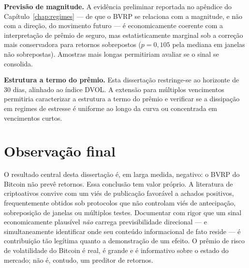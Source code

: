 \textbf{Previsão de magnitude.} A evidência preliminar reportada no apêndice do Capítulo~\ref{chap:regimes} --- de que o BVRP se relaciona com a magnitude, e não com a direção, do movimento futuro --- é economicamente coerente com a interpretação de prêmio de seguro, mas estatisticamente marginal sob a correção mais conservadora para retornos sobrepostos ($p = 0{,}105$ pela mediana em janelas não sobrepostas). Amostras mais longas permitiriam avaliar se o sinal se consolida.

\textbf{Estrutura a termo do prêmio.} Esta dissertação restringe-se ao horizonte de 30 dias, alinhado ao índice DVOL. A extensão para múltiplos vencimentos permitiria caracterizar a estrutura a termo do prêmio e verificar se a dissipação em regimes de estresse é uniforme ao longo da curva ou concentrada em vencimentos curtos.

\section{Observação final}
\label{sec:conclusao_final}

O resultado central desta dissertação é, em larga medida, negativo: o BVRP do Bitcoin não prevê retornos. Essa conclusão tem valor próprio. A literatura de criptoativos convive com um viés de publicação favorável a achados positivos, frequentemente obtidos sob protocolos que não controlam viés de antecipação, sobreposição de janelas ou múltiplos testes. Documentar com rigor que um sinal economicamente plausível \emph{não} carrega previsibilidade direcional --- e simultaneamente identificar onde seu conteúdo informacional de fato reside --- é contribuição tão legítima quanto a demonstração de um efeito. O prêmio de risco de volatilidade do Bitcoin é real, é grande e é informativo sobre o estado do mercado; não é, contudo, um preditor de retornos.
